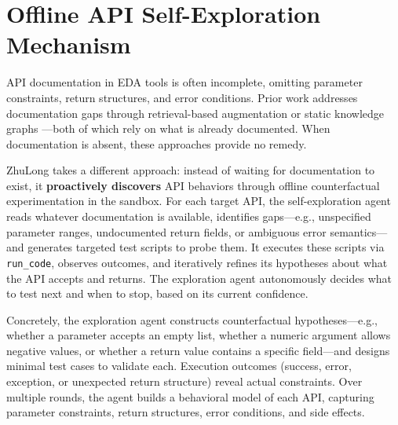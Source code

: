 \section{Offline API Self-Exploration Mechanism}
\label{sec:selfdoc}

API documentation in EDA tools is often incomplete, omitting parameter constraints, return structures, and error conditions. Prior work addresses documentation gaps through retrieval-based augmentation \cite{pu2024rag} or static knowledge graphs \cite{liu2025layoutcopilot}—both of which rely on what is already documented. When documentation is absent, these approaches provide no remedy.


ZhuLong takes a different approach: instead of waiting for documentation to exist, it \textbf{proactively discovers} API behaviors through offline counterfactual experimentation in the sandbox. For each target API, the self-exploration agent reads whatever documentation is available, identifies gaps—e.g., unspecified parameter ranges, undocumented return fields, or ambiguous error semantics—and generates targeted test scripts to probe them. It executes these scripts via \texttt{run\_code}, observes outcomes, and iteratively refines its hypotheses about what the API accepts and returns. The exploration agent autonomously decides what to test next and when to stop, based on its current confidence.


Concretely, the exploration agent constructs counterfactual hypotheses—e.g., whether a parameter accepts an empty list, whether a numeric argument allows negative values, or whether a return value contains a specific field—and designs minimal test cases to validate each. Execution outcomes (success, error, exception, or unexpected return structure) reveal actual constraints. Over multiple rounds, the agent builds a behavioral model of each API, capturing parameter constraints, return structures, error conditions, and side effects.

